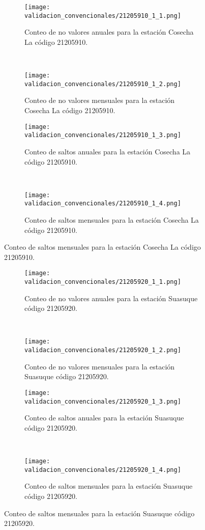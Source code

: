 \begin{figure}[H]
	\centering
	\begin{subfigure}[normla]{0.4\textwidth}
	\texttt{[image: validacion\_convencionales/21205910\_1\_1.png]}
		\caption{Conteo de no valores anuales para la estación Cosecha La código 21205910.}
		\label{subfig:a1}
		\end{subfigure}
		~
    \begin{subfigure}[normla]{0.4\textwidth}
	\texttt{[image: validacion\_convencionales/21205910\_1\_2.png]}
		\caption{Conteo de no valores mensuales para la estación Cosecha La código 21205910.}
		\label{subfig:a2}
		\end{subfigure}
		
    \begin{subfigure}[normla]{0.4\textwidth}
	\texttt{[image: validacion\_convencionales/21205910\_1\_3.png]}
		\caption{Conteo de saltos anuales para la estación Cosecha La código 21205910.}
		\label{subfig:a1}
		\end{subfigure}
		~
    \begin{subfigure}[normla]{0.4\textwidth}
	\texttt{[image: validacion\_convencionales/21205910\_1\_4.png]}
		\caption{Conteo de saltos mensuales para la estación Cosecha La código 21205910.}
		\label{subfig:a2}
		\end{subfigure}

	
\end{figure}
           
\begin{figure}[H]\ContinuedFloat
\centering
	\begin{subfigure}[normla]{0.4\textwidth}
	\texttt{[image: validacion\_convencionales/21205920\_1\_1.png]}
		\caption{Conteo de no valores anuales para la estación Suasuque    código 21205920.}
		\label{subfig:a1}
		\end{subfigure}
		~
    \begin{subfigure}[normla]{0.4\textwidth}
	\texttt{[image: validacion\_convencionales/21205920\_1\_2.png]}
		\caption{Conteo de no valores mensuales para la estación Suasuque    código 21205920.}
		\label{subfig:a2}
		\end{subfigure}
		
    \begin{subfigure}[normla]{0.4\textwidth}
	\texttt{[image: validacion\_convencionales/21205920\_1\_3.png]}
		\caption{Conteo de saltos anuales para la estación Suasuque    código 21205920.}
		\label{subfig:a1}
		\end{subfigure}
		~
    \begin{subfigure}[normla]{0.4\textwidth}
	\texttt{[image: validacion\_convencionales/21205920\_1\_4.png]}
		\caption{Conteo de saltos mensuales para la estación Suasuque    código 21205920.}
		\label{subfig:a2}
		\end{subfigure}

	
\end{figure}
           

